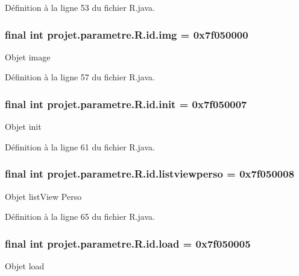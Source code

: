 \-Définition à la ligne 53 du fichier \-R.\-java.

\subsubsection[{img}]{\setlength{\rightskip}{0pt plus 5cm}final int {\bf projet.\-parametre.\-R.\-id.\-img} = 0x7f050000\hspace{0.3cm}{\ttfamily  [static]}}\label{classprojet_1_1parametre_1_1_r_1_1id_a1a4162878f56a0739d37bf16220b02b3}
\-Objet image 

\-Définition à la ligne 57 du fichier \-R.\-java.

\subsubsection[{init}]{\setlength{\rightskip}{0pt plus 5cm}final int {\bf projet.\-parametre.\-R.\-id.\-init} = 0x7f050007\hspace{0.3cm}{\ttfamily  [static]}}\label{classprojet_1_1parametre_1_1_r_1_1id_a500479f13add33660fad0976d461b252}
\-Objet init 

\-Définition à la ligne 61 du fichier \-R.\-java.

\subsubsection[{listviewperso}]{\setlength{\rightskip}{0pt plus 5cm}final int {\bf projet.\-parametre.\-R.\-id.\-listviewperso} = 0x7f050008\hspace{0.3cm}{\ttfamily  [static]}}\label{classprojet_1_1parametre_1_1_r_1_1id_a85f523e4c934bd71c97349bd46122b67}
\-Objet list\-View \-Perso 

\-Définition à la ligne 65 du fichier \-R.\-java.

\subsubsection[{load}]{\setlength{\rightskip}{0pt plus 5cm}final int {\bf projet.\-parametre.\-R.\-id.\-load} = 0x7f050005\hspace{0.3cm}{\ttfamily  [static]}}\label{classprojet_1_1parametre_1_1_r_1_1id_aba056501c60588d7d893a8f36591a8cc}
\-Objet load 

